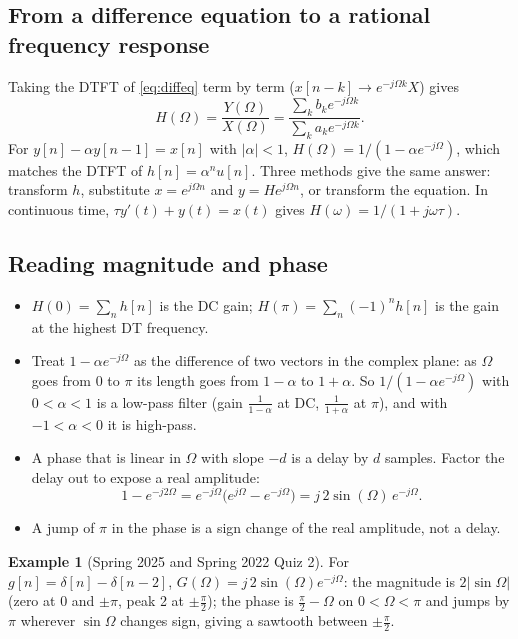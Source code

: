 \documentclass[11pt]{article}
\numberwithin{equation}{section}
\theoremstyle{definition}
\newtheorem{example}{Example}[section]
\theoremstyle{remark}
\begin{document}
\subsection{From a difference equation to a rational frequency response}
Taking the DTFT of \eqref{eq:diffeq} term by term ($x[n-k]\to e^{-j\Omega k}X$) gives
\begin{equation}
H(\Omega)=\frac{Y(\Omega)}{X(\Omega)}=\frac{\sum_k b_ke^{-j\Omega k}}{\sum_k a_ke^{-j\Omega k}}.
\end{equation}
For $y[n]-\alpha y[n-1]=x[n]$ with $|\alpha|<1$, $H(\Omega)=1/(1-\alpha e^{-j\Omega})$, which
matches the DTFT of $h[n]=\alpha^nu[n]$. Three methods give the same answer: transform $h$,
substitute $x=e^{j\Omega n}$ and $y=He^{j\Omega n}$, or transform the equation.
In continuous time, $\tau y'(t)+y(t)=x(t)$ gives $H(\omega)=1/(1+j\omega\tau)$.

\subsection{Reading magnitude and phase}
\begin{itemize}
\item $H(0)=\sum_n h[n]$ is the DC gain; $H(\pi)=\sum_n(-1)^nh[n]$ is the gain at the highest DT
frequency.
\item Treat $1-\alpha e^{-j\Omega}$ as the difference of two vectors in the complex plane: as $\Omega$
goes from 0 to $\pi$ its length goes from $1-\alpha$ to $1+\alpha$. So $1/(1-\alpha e^{-j\Omega})$
with $0<\alpha<1$ is a low-pass filter (gain $\frac1{1-\alpha}$ at DC, $\frac1{1+\alpha}$ at $\pi$),
and with $-1<\alpha<0$ it is high-pass.
\item A phase that is linear in $\Omega$ with slope $-d$ is a delay by $d$ samples. Factor the
delay out to expose a real amplitude:
\begin{equation}
1-e^{-j2\Omega}=e^{-j\Omega}\big(e^{j\Omega}-e^{-j\Omega}\big)=j\,2\sin(\Omega)\,e^{-j\Omega}.
\end{equation}
\item A jump of $\pi$ in the phase is a sign change of the real amplitude, not a delay.
\end{itemize}

\begin{example}[Spring 2025 and Spring 2022 Quiz 2]
For $g[n]=\delta[n]-\delta[n-2]$, $G(\Omega)=j\,2\sin(\Omega)e^{-j\Omega}$: the magnitude is
$2|\sin\Omega|$ (zero at $0$ and $\pm\pi$, peak 2 at $\pm\frac\pi2$); the phase is
$\frac\pi2-\Omega$ on $0<\Omega<\pi$ and jumps by $\pi$ wherever $\sin\Omega$ changes sign, giving a
sawtooth between $\pm\frac\pi2$.
\end{example}
\end{document}
